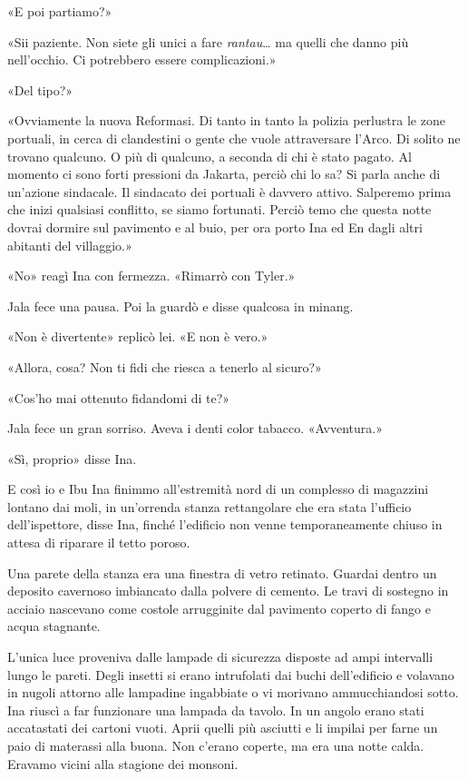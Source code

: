 «E poi partiamo?»

«Sii paziente. Non siete gli unici a fare \emph{rantau}\ldots{} ma
quelli che danno più nell'occhio. Ci potrebbero essere complicazioni.»

«Del tipo?»

«Ovviamente la nuova Reformasi. Di tanto in tanto la polizia perlustra
le zone portuali, in cerca di clandestini o gente che vuole attraversare
l'Arco. Di solito ne trovano qualcuno. O più di qualcuno, a seconda di
chi è stato pagato. Al momento ci sono forti pressioni da Jakarta,
perciò chi lo sa? Si parla anche di un'azione sindacale. Il sindacato
dei portuali è davvero attivo. Salperemo prima che inizi qualsiasi
conflitto, se siamo fortunati. Perciò temo che questa notte dovrai
dormire sul pavimento e al buio, per ora porto Ina ed En dagli altri
abitanti del villaggio.»

«No» reagì Ina con fermezza. «Rimarrò con Tyler.»

Jala fece una pausa. Poi la guardò e disse qualcosa in minang.

«Non è divertente» replicò lei. «E non è vero.»

«Allora, cosa? Non ti fidi che riesca a tenerlo al sicuro?»

«Cos'ho mai ottenuto fidandomi di te?»

Jala fece un gran sorriso. Aveva i denti color tabacco. «Avventura.»

«Sì, proprio» disse Ina.

\separatorefiori

E così io e Ibu Ina finimmo all'estremità nord di un complesso di
magazzini lontano dai moli, in un'orrenda stanza rettangolare che era
stata l'ufficio dell'ispettore, disse Ina, finché l'edificio non venne
temporaneamente chiuso in attesa di riparare il tetto poroso.

Una parete della stanza era una finestra di vetro retinato. Guardai
dentro un deposito cavernoso imbiancato dalla polvere di cemento. Le
travi di sostegno in acciaio nascevano come costole arrugginite dal
pavimento coperto di fango e acqua stagnante.

L'unica luce proveniva dalle lampade di sicurezza disposte ad ampi
intervalli lungo le pareti. Degli insetti si erano intrufolati dai buchi
dell'edificio e volavano in nugoli attorno alle lampadine ingabbiate o
vi morivano ammucchiandosi sotto. Ina riuscì a far funzionare una
lampada da tavolo. In un angolo erano stati accatastati dei cartoni
vuoti. Aprii quelli più asciutti e li impilai per farne un paio di
materassi alla buona. Non c'erano coperte, ma era una notte calda.
Eravamo vicini alla stagione dei monsoni.

